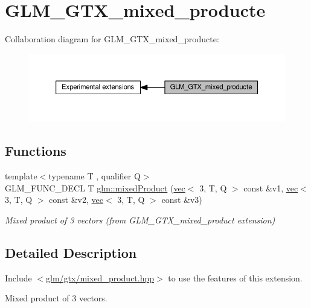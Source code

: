 \hypertarget{group__gtx__mixed__product}{}\section{G\+L\+M\+\_\+\+G\+T\+X\+\_\+mixed\+\_\+producte}
\label{group__gtx__mixed__product}
Collaboration diagram for G\+L\+M\+\_\+\+G\+T\+X\+\_\+mixed\+\_\+producte\+:
\nopagebreak
\begin{figure}[H]
\begin{center}
\leavevmode
\includegraphics[width=350pt]{de/d17/group__gtx__mixed__product}
\end{center}
\end{figure}
\subsection*{Functions}
\begin{DoxyCompactItemize}
\item 
\mbox{\label{group__gtx__mixed__product_gab3c6048fbb67f7243b088a4fee48d020}} 
{\footnotesize template$<$typename T , qualifier Q$>$ }\\G\+L\+M\+\_\+\+F\+U\+N\+C\+\_\+\+D\+E\+CL T \hyperlink{group__gtx__mixed__product_gab3c6048fbb67f7243b088a4fee48d020}{glm\+::mixed\+Product} (\hyperlink{structglm_1_1vec}{vec}$<$ 3, T, Q $>$ const \&v1, \hyperlink{structglm_1_1vec}{vec}$<$ 3, T, Q $>$ const \&v2, \hyperlink{structglm_1_1vec}{vec}$<$ 3, T, Q $>$ const \&v3)
\begin{DoxyCompactList}\small\item\em Mixed product of 3 vectors (from G\+L\+M\+\_\+\+G\+T\+X\+\_\+mixed\+\_\+product extension) \end{DoxyCompactList}\end{DoxyCompactItemize}


\subsection{Detailed Description}
Include $<$\hyperlink{mixed__product_8hpp}{glm/gtx/mixed\+\_\+product.\+hpp}$>$ to use the features of this extension.

Mixed product of 3 vectors. 